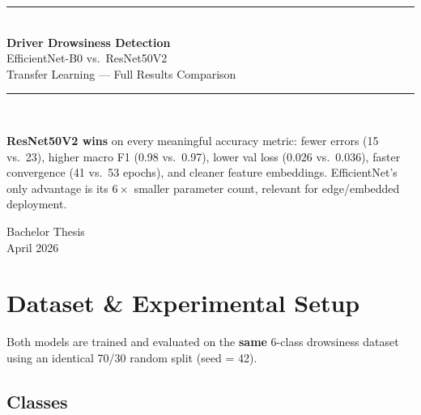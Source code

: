 \documentclass[12pt,a4paper]{article}
\begin{document}

\begin{titlepage}
  \centering
  \vspace*{2cm}
  {\color{primary}\rule{\linewidth}{2pt}}\\[1em]
  {\Huge\bfseries\color{primary} Driver Drowsiness Detection}\\[0.6em]
  {\LARGE\color{secondary} EfficientNet-B0 vs.\ ResNet50V2}\\[0.4em]
  {\large Transfer Learning — Full Results Comparison}\\[0.5em]
  {\color{primary}\rule{\linewidth}{2pt}}\\[2em]

  \begin{tcolorbox}[summarybox, title=Quick Verdict, width=0.82\linewidth]
    \textbf{ResNet50V2 wins} on every meaningful accuracy metric:
    fewer errors (15 vs.\ 23), higher macro F1 (0.98 vs.\ 0.97),
    lower val loss (0.026 vs.\ 0.036), faster convergence (41 vs.\ 53 epochs),
    and cleaner feature embeddings.
    EfficientNet's only advantage is its $6\times$ smaller parameter count,
    relevant for edge/embedded deployment.
  \end{tcolorbox}

  \vspace{2em}
  {\large Bachelor Thesis\\[0.3em] April 2026}
  \vfill
\end{titlepage}

\tableofcontents
\newpage

\section{Dataset \& Experimental Setup}

Both models are trained and evaluated on the \textbf{same} 6-class drowsiness dataset
using an identical 70/30 random split (seed = 42).

\subsection{Classes}
\end{document}
